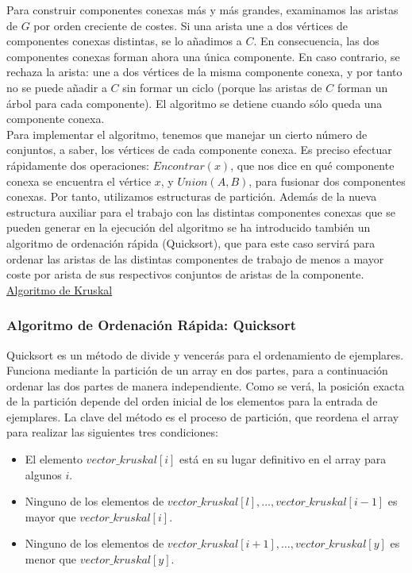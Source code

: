 Para construir componentes conexas más y más grandes, examinamos las aristas de $G$ por orden creciente de costes. Si una arista une a dos vértices de componentes conexas distintas, se lo añadimos a $C$. En consecuencia, las dos componentes conexas forman ahora una única componente. En caso contrario, se rechaza la arista: une a dos vértices de la misma componente conexa, y por tanto no se puede añadir a $C$ sin formar un ciclo (porque las aristas de $C$ forman un árbol para cada componente). El algoritmo se detiene cuando sólo queda una componente conexa.\\

Para implementar el algoritmo, tenemos que manejar un cierto número de conjuntos, a saber, los vértices de cada componente conexa. Es preciso efectuar rápidamente dos operaciones: $Encontrar(x)$, que nos dice en qué componente conexa se encuentra el vértice $x$, y $Union(A,B)$, para fusionar dos componentes conexas. Por tanto, utilizamos estructuras de partición. Además de la nueva estructura auxiliar para el trabajo con las distintas componentes conexas que se pueden generar en la ejecución del algoritmo se ha introducido también un algoritmo de ordenación rápida (Quicksort), que para este caso servirá para ordenar las aristas de las distintas componentes de trabajo de menos a mayor coste por arista de sus respectivos conjuntos de aristas de la componente.\\

\underline{Algoritmo de Kruskal}\\


\subsubsection{Algoritmo de Ordenación Rápida: Quicksort}

Quicksort es un método de divide y vencerás para el ordenamiento de ejemplares. Funciona mediante la partición de un array en dos partes, para a continuación ordenar las dos partes de manera independiente. Como se verá, la posición exacta de la partición depende del orden inicial de los elementos para la entrada de ejemplares. La clave del método es el proceso de partición, que reordena el array para realizar las siguientes tres condiciones:

\begin{itemize}
\item El elemento $vector\_kruskal[i]$ está en su lugar definitivo en el array para algunos $i$.
\item Ninguno de los elementos de $vector\_kruskal[l], \ldots, vector\_kruskal[i-1]$ es mayor que $vector\_kruskal[i]$.
\item Ninguno de los elementos de $vector\_kruskal[i+1], \ldots, vector\_kruskal[y]$ es menor que $vector\_kruskal[y]$.
\end{itemize}

